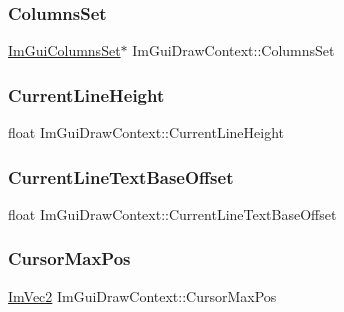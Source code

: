 \hypertarget{struct_im_gui_draw_context_a7c9cf59580945944f84885ba91186ee3}{}\label{struct_im_gui_draw_context_a7c9cf59580945944f84885ba91186ee3} 
\subsubsection{\texorpdfstring{Columns\+Set}{ColumnsSet}}
{\footnotesize\ttfamily \hyperlink{struct_im_gui_columns_set}{Im\+Gui\+Columns\+Set}$\ast$ Im\+Gui\+Draw\+Context\+::\+Columns\+Set}

\hypertarget{struct_im_gui_draw_context_a950b71358ebfed5a884936f5cafed873}{}\label{struct_im_gui_draw_context_a950b71358ebfed5a884936f5cafed873} 
\subsubsection{\texorpdfstring{Current\+Line\+Height}{CurrentLineHeight}}
{\footnotesize\ttfamily float Im\+Gui\+Draw\+Context\+::\+Current\+Line\+Height}

\hypertarget{struct_im_gui_draw_context_af6f0a3536765c5f638fd198749bf29f1}{}\label{struct_im_gui_draw_context_af6f0a3536765c5f638fd198749bf29f1} 
\subsubsection{\texorpdfstring{Current\+Line\+Text\+Base\+Offset}{CurrentLineTextBaseOffset}}
{\footnotesize\ttfamily float Im\+Gui\+Draw\+Context\+::\+Current\+Line\+Text\+Base\+Offset}

\hypertarget{struct_im_gui_draw_context_add16f0294ab2fd07b354da2bb99e43e1}{}\label{struct_im_gui_draw_context_add16f0294ab2fd07b354da2bb99e43e1} 
\subsubsection{\texorpdfstring{Cursor\+Max\+Pos}{CursorMaxPos}}
{\footnotesize\ttfamily \hyperlink{struct_im_vec2}{Im\+Vec2} Im\+Gui\+Draw\+Context\+::\+Cursor\+Max\+Pos}

